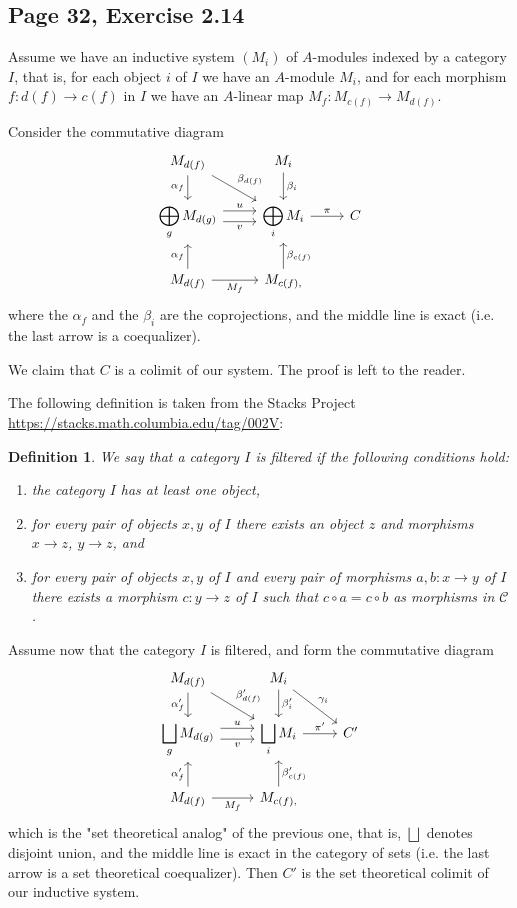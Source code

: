 \documentclass[parskip=half,fontsize=12pt]{scrartcl}%
\newcommand{\ds}{\displaystyle}
\newtheorem{df}[thm]{Definition}
\begin{document}
\subsection{Page 32, Exercise 2.14}\label{colim}%

Assume we have an inductive system $(M_i)$ of $A$-modules indexed by a category  $I$, that is, for each object $i$ of $I$ we have an $A$-module $M_i$, and for each morphism $f:d(f)\to c(f)$ in $I$ we have an $A$-linear map $M_f:M_{c(f)}\to M_{d(f)}$. 

Consider the commutative diagram %
$$
\begin{tikzcd}
M_{d(f)}\ar[d,"\alpha_{f}"']\ar[dr,"\beta_{d(f)}"]&M_i\ar[d,"\beta_i"]\\ 
\ds\bigoplus_gM_{d(g)}\ar[r,yshift=0.9ex,"u"]\ar[r,yshift=-0.9ex,"v"']&\ds\bigoplus_iM_i\ar[r,"\pi"]&C\\ 
M_{d(f)}\ar[u,"\alpha_{f}"]\ar[r,"M_f"']&M_{c(f),}\ar[u,"\beta_{c(f)}"']
\end{tikzcd}
$$ 
where the $\alpha_f$ and the $\beta_i$ are the coprojections, and the middle line is exact (i.e. the last arrow is a coequalizer). 

We claim that $C$ is a colimit of our system. The proof is left to the reader.

The following definition is taken from the Stacks Project \\ \href{https://stacks.math.columbia.edu/tag/002V}{https://stacks.math.columbia.edu/tag/002V}:

\begin{df}
We say that a category $I$ is \emph{filtered} if the following conditions hold:
\begin{enumerate}
\item the category $I$ has at least one object,
\item for every pair of objects $x, y$ of $I$ there exists an object $z$ and morphisms $x \to z$, $y \to z$, and
\item for every pair of objects $x, y$ of $I$ and every pair of morphisms $a, b : x \to y$ of $I$ there exists a morphism $c : y \to z$ of $I$ such that $c \circ a=c\circ b$ as morphisms in $\mathcal{C}$.
\end{enumerate}
\end{df}

Assume now that the category $I$ is filtered, and form the commutative diagram %
$$
\begin{tikzcd}
M_{d(f)}\ar[d,"\alpha'_{f}"']\ar[dr,"\beta'_{d(f)}"]&M_i\ar[d,"\beta'_i"]\ar[dr,"\gamma_i"]\\ 
\ds\bigsqcup_gM_{d(g)}\ar[r,yshift=0.9ex,"u"]\ar[r,yshift=-0.9ex,"v"']&\ds\bigsqcup_iM_i\ar[r,"\pi'"]&C'\\ 
M_{d(f)}\ar[u,"\alpha'_{f}"]\ar[r,"M_f"']&M_{c(f),}\ar[u,"\beta'_{c(f)}"']
\end{tikzcd}
$$ 
which is the "set theoretical analog" of the previous one, that is, $\bigsqcup$ denotes disjoint union, and the middle line is exact in the category of sets (i.e. the last arrow is a set theoretical coequalizer). Then $C'$ is the set theoretical colimit of our inductive system. 
\end{document}
